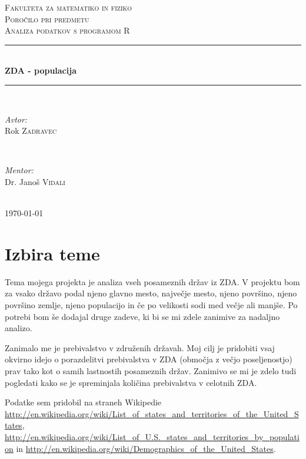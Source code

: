 \documentclass[11pt,a4paper]{article}
\begin{document}
\begin{titlepage}
\newcommand{\HRule}{\rule{\linewidth}{0.5mm}}
\center

\textsc{\LARGE Fakulteta za matematiko in fiziko}\\[3 cm]
\textsc{\Large Poročilo pri predmetu}\\[0.5cm]
\textsc{\large Analiza podatkov s programom R}\\[2 cm]
\HRule \\[0.4cm]
{ \huge \bfseries ZDA - populacija}\\[0.4cm] 
\HRule \\[6 cm]


\begin{minipage}{0.4\textwidth}
\begin{flushleft} \large
\emph{Avtor:}\\
Rok \textsc{Zadravec}
\end{flushleft}
\end{minipage}
~
\begin{minipage}{0.4\textwidth}
\begin{flushright} \large
\emph{Mentor:} \\
Dr. Janoš \textsc{Vidali}
\end{flushright}
\end{minipage}\\[2 cm]

{\large \today}\\[3cm] 


\end{titlepage}

\section{Izbira teme}

Tema mojega projekta je analiza vseh posameznih držav iz ZDA. V projektu bom za vsako državo podal njeno glavno mesto, največje mesto, njeno površino, njeno površino zemlje, njeno populacijo in če po velikosti sodi med večje ali manjše. Po potrebi bom še dodajal druge zadeve, ki bi se mi zdele zanimive za nadaljno analizo.

Zanimalo me je prebivalstvo v združenih državah. Moj cilj je pridobiti vsaj okvirno idejo o porazdelitvi prebivalstva v ZDA (območja z večjo poseljenostjo) prav tako kot o samih lastnostih posameznih držav. Zanimivo se mi je zdelo tudi pogledati kako se je spreminjala količina
prebivalstva v celotnih ZDA.

Podatke sem pridobil na straneh Wikipedie \url{http://en.wikipedia.org/wiki/List_of_states_and_territories_of_the_United_States}, \url{http://en.wikipedia.org/wiki/List_of_U.S._states_and_territories_by_population} in \url{http://en.wikipedia.org/wiki/Demographics_of_the_United_States}.
\end{document}
